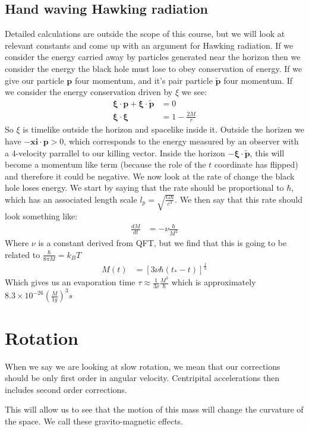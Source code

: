 \subsection{Hand waving Hawking radiation}
Detailed calculations are outside the scope of this course, but we will look at relevant constants and come up with an argument for Hawking radiation.
If we consider the energy carried away by particles generated near the horizon then we consider the energy the black hole must lose to obey conservation of energy.
If we give our particle $\bm{p}$ four momentum, and it's pair particle $\tilde{\bm{p}}$ four momentum. If we consider the energy conservation driven by $\xi$ we see:
\begin{align*}
	\bm{\xi}\cdot\bm{p} + \bm{\xi}\cdot\tilde{\bm{p}} &= 0 \\
	\bm{\xi}\cdot\bm{\xi} &= 1 -\frac{2M}{r}
\end{align*}
So $\xi$ is timelike outside the horizon and spacelike inside it. Outside the horizen we have $-\bm{xi}\cdot\bm{p} >0$, which corresponds to the energy measured by an observer with a 4-velocity parrallel to our killing vector.
Inside the horizon $-\bm{\xi}\cdot\tilde{\bm{p}}$, this will become a momentum like term (because the role of the $t$ coordinate has flipped) and therefore it could be negative. We now look at the rate of change the black hole loses energy.
We start by saying that the rate should be proportional to $\hbar$, which has an associated length scale $l_p = \sqrt{\frac{G\hbar}{c^3}}$. We then say that this rate should look something like:
\begin{align*}
	\frac{dM}{dt} &= -\nu \frac{\hbar}{M^2}
\end{align*}
Where $\nu$ is a constant derived from QFT, but we find that this is going to be related to $\frac{\hbar}{8\pi M} = k_B T$
\begin{align*}
	M(t) &= \left[3\nu\hbar(t_* -t)\right]^\frac{1}{3}
\end{align*}
Which gives us an evaporation time $\tau \approx \frac{1}{3\nu}\frac{M^3}{\hbar}$ which is approximately $8.3 \times 10^{-26} \left(\frac{M}{1 g}\right)^3 s$
\section{Rotation}
When we say we are looking at slow rotation, we mean that our corrections should be only first order in angular velocity. Centripital accelerations then includes second order corrections.

This will allow us to see that the motion of this mass will change the curvature of the space. We call these gravito-magnetic effects.
